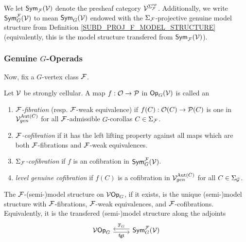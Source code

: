 \documentclass[a4paper,10pt]{article}%
\begin{document}
\begin{notation}
  We let $\mathsf{Sym}_{\mathcal F}(\mathcal V)$ denote the presheaf category $\mathcal V^{\Sigma_{\mathcal F}^{op}}$. 
  Additionally, we write $\mathsf{Sym}_G^{\mathcal F}(\mathcal V)$ to mean $\mathsf{Sym}_G(\mathcal V)$ endowed with the $\Sigma_{\mathcal F}$-projective genuine model structure from Definition \ref{SUBD_PROJ_F_MODEL_STRUCTURE} (equivalently, this is the model structure transfered from $\mathsf{Sym}_{\mathcal F}(\mathcal V)$).
\end{notation}



\subsubsection{Genuine $G$-Operads}

Now, fix a $G$-vertex class $\mathcal F$.

\begin{definition} 
  Let $\mathcal V$ be strongly cellular. A map $f: \mathcal{O} \to \mathcal{P}$ in $\mathsf{Op}_G(\mathcal V)$ is called an  
  \begin{enumerate} 
  \item \textit{$\mathcal F$-fibration} (resp. $\mathcal F$-weak equivalence) if $f(C):\mathcal{O}(C) \to \mathcal{P}(C)$ is one in $\mathcal V^{\mathrm{Aut}(C)}_{gen}$ for all $\mathcal F$-admissible $G$-corollas $C\in\Sigma_{\mathcal F}$. 
  \item \textit{$\mathcal F$-cofibration} if it has the left lifting property against all maps which are both $\mathcal F$-fibrations and $\mathcal F$-weak equivalences. 
  \item \textit{$\Sigma_{\mathcal F}$-cofibration} if $f$ is an cofibration in $\mathsf{Sym}_G^{\mathcal F}(\mathcal V)$. 
  \item \textit{level genuine cofibration} if $f(C)$ is a cofibration in $\mathcal V^{\mathrm{Aut}(C)}_{gen}$ for all $C\in \Sigma_{\mathcal{G}}$. 
  \end{enumerate} 
\end{definition} 


\begin{definition} 
  The $\mathcal F$-(semi-)model structure on $\mathcal V\mathsf{Op}_G$, if it exists, is the unique (semi-)model structure with $\mathcal F$-fibrations, $\mathcal F$-weak equivalences, and $\mathcal F$-cofibrations. Equivalently, it is the transfered (semi-)model structure along the adjoints 
  \[ 
  \begin{tikzcd} 
    \V\Op_G \arrow[r, shift right, "\mathsf{fgt}"'] & \Sym_G^\F(\V) \arrow[l, shift right, "\mathbb F_G"']
  \end{tikzcd} 
  \] 
\end{definition} 
\end{document}
